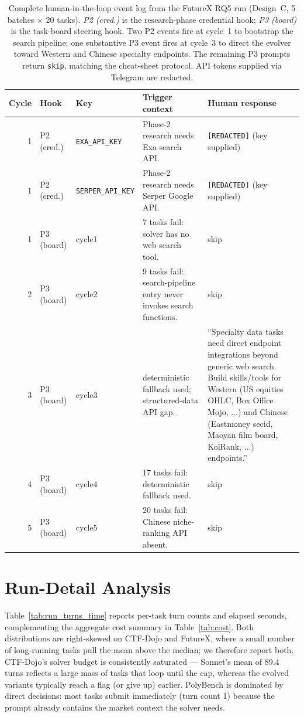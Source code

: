 \documentclass[11pt]{article}
\theoremstyle{plain}
\begin{document}
\begin{table}[t]
\centering\footnotesize
\setlength{\tabcolsep}{4pt}
\caption{Complete human-in-the-loop event log from the FutureX RQ5 run (Design~C, 5 batches $\times$ 20 tasks). \emph{P2 (cred.)} is the research-phase credential hook; \emph{P3 (board)} is the task-board steering hook. Two P2 events fire at cycle~1 to bootstrap the search pipeline; one substantive P3 event fires at cycle~3 to direct the evolver toward Western and Chinese specialty endpoints. The remaining P3 prompts return \texttt{skip}, matching the cheat-sheet protocol. API tokens supplied via Telegram are redacted.}
\label{tab:hitl_log}
\renewcommand{\arraystretch}{1.15}
\begin{tabular}{@{}rllp{}p{}@{}}
\toprule
Cycle & Hook & Key & Trigger context & Human response \\
\midrule
1 & P2 (cred.) & \texttt{EXA\_API\_KEY} & Phase-2 research needs Exa search API. & \texttt{[REDACTED]} (key supplied) \\
1 & P2 (cred.) & \texttt{SERPER\_API\_KEY} & Phase-2 research needs Serper Google API. & \texttt{[REDACTED]} (key supplied) \\
1 & P3 (board) & cycle1 & 7 tasks fail: solver has no web search tool. & skip \\
2 & P3 (board) & cycle2 & 9 tasks fail: search-pipeline entry never invokes search functions. & skip \\
3 & P3 (board) & cycle3 & deterministic fallback used; structured-data API gap. & ``Specialty data tasks need direct endpoint integrations beyond generic web search. Build skills/tools for Western (US equities OHLC, Box Office Mojo, $\ldots$) and Chinese (Eastmoney secid, Maoyan film board, KolRank, $\ldots$) endpoints.'' \\
4 & P3 (board) & cycle4 & 17 tasks fail: deterministic fallback used. & skip \\
5 & P3 (board) & cycle5 & 20 tasks fail: Chinese niche-ranking API absent. & skip \\
\bottomrule
\end{tabular}
\end{table}


\section{Run-Detail Analysis}
\label{app:run_details}

Table~\ref{tab:run_turns_time} reports per-task turn counts and elapsed seconds, complementing the aggregate cost summary in Table~\ref{tab:cost}. Both distributions are right-skewed on CTF-Dojo and FutureX, where a small number of long-running tasks pull the mean above the median; we therefore report both. CTF-Dojo's solver budget is consistently saturated --- Sonnet's mean of 89.4 turns reflects a large mass of tasks that loop until the cap, whereas the evolved variants typically reach a flag (or give up) earlier. PolyBench is dominated by direct decisions: most tasks submit immediately (turn count 1) because the prompt already contains the market context the solver needs.
\end{document}
